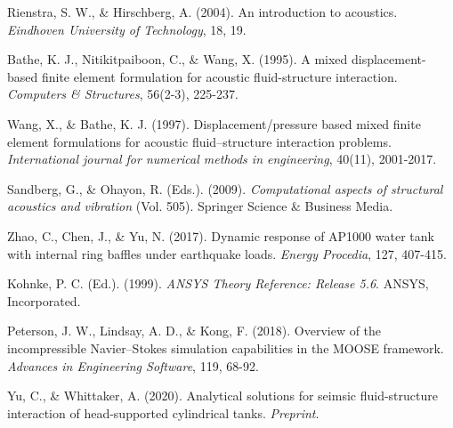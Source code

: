 \documentclass[3p]{elsarticle}
\begin{document}
\begin{thebibliography}{9}
Rienstra, S. W., \& Hirschberg, A. (2004). An introduction to acoustics. \textit{Eindhoven University of Technology}, 18, 19.

Bathe, K. J., Nitikitpaiboon, C., \& Wang, X. (1995). A mixed displacement-based finite element formulation for acoustic fluid-structure interaction. \textit{Computers \& Structures}, 56(2-3), 225-237.

Wang, X., \& Bathe, K. J. (1997). Displacement/pressure based mixed finite element formulations for acoustic fluid–structure interaction problems. \textit{International journal for numerical methods in engineering}, 40(11), 2001-2017.

Sandberg, G., \& Ohayon, R. (Eds.). (2009). \textit{Computational aspects of structural acoustics and vibration} (Vol. 505). Springer Science \& Business Media.

Zhao, C., Chen, J., \& Yu, N. (2017). Dynamic response of AP1000 water tank with internal ring baffles under earthquake loads. \textit{Energy Procedia}, 127, 407-415.

Kohnke, P. C. (Ed.). (1999). \textit{ANSYS Theory Reference: Release 5.6}. ANSYS, Incorporated.

Peterson, J. W., Lindsay, A. D., \& Kong, F. (2018). Overview of the incompressible Navier–Stokes simulation capabilities in the MOOSE framework. \textit{Advances in Engineering Software}, 119, 68-92.

Yu, C., \& Whittaker, A. (2020). Analytical solutions for seimsic fluid-structure interaction of head-supported cylindrical tanks. \textit{Preprint}.

\end{thebibliography}
\end{document}
